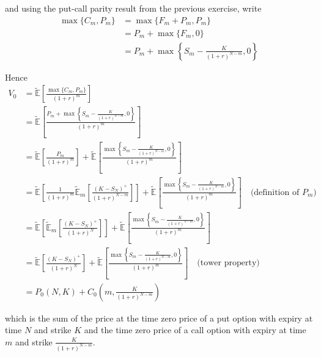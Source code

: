 \documentclass[12pt]{article}
\newcommand{\E}{\mathbb E}
\begin{document}
and using the put-call parity result from the previous exercise, write
\begin{align*}
	\max \{ C_m, P_m \} &= \max \{ F_m + P_m, P_m \} \\
	&= P_m + \max \{ F_m, 0 \} \\
	&= P_m + \max \left\{ S_m - \frac{ K }{ (1 + r)^{N - m} }, 0 \right\}
\end{align*}

Hence
\begin{align*}
	V_0 &= \tilde{\E} \left[ \frac{ \max \{ C_m, P_m \} }{ (1 + r)^m } \right] \\
	&= \tilde{\E} \left[ \frac{ P_m + \max \left\{ S_m - \frac{ K }{ (1 + r)^{N - m} }, 0 \right\} }{ (1 + r)^m } \right] \\
	&= \tilde{\E} \left[ \frac{ P_m }{ (1 + r)^m } \right] + \tilde{\E} \left[ \frac{ \max \left\{ S_m - \frac{ K }{ (1 + r)^{N - m} }, 0 \right\} }{ (1 + r)^m } \right] \\
	&= \tilde{\E} \left[ \frac{ 1 }{ (1 + r)^m } \tilde{\E}_m \left[ \frac{ (K - S_N)^+ }{ (1 + r)^{N - m}} \right] \right] + \tilde{\E} \left[ \frac{ \max \left\{ S_m - \frac{ K }{ (1 + r)^{N - m} }, 0 \right\} }{ (1 + r)^m } \right] \quad \text{(definition of $P_m$)} \\
	&= \tilde{\E} \left[ \tilde{\E}_m \left[ \frac{ (K - S_N)^+ }{ (1 + r)^N} \right] \right] + \tilde{\E} \left[ \frac{ \max \left\{ S_m - \frac{ K }{ (1 + r)^{N - m} }, 0 \right\} }{ (1 + r)^m } \right] \\
	&= \tilde{\E} \left[ \frac{ (K - S_N)^+ }{ (1 + r)^N} \right] + \tilde{\E} \left[ \frac{ \max \left\{ S_m - \frac{ K }{ (1 + r)^{N - m} }, 0 \right\} }{ (1 + r)^m } \right] \quad \text{(tower property)} \\
	&= P_0(N, K) + C_0 \left(m, \frac{K}{(1 + r)^{N - m}} \right) 
\end{align*}

which is the sum of the price at the time zero price of a put option with expiry at time $N$ and strike $K$ and the time zero price of a call option with expiry at time $m$ and strike $\frac{K}{(1 + r)^{N - m}}$.
\end{document}
